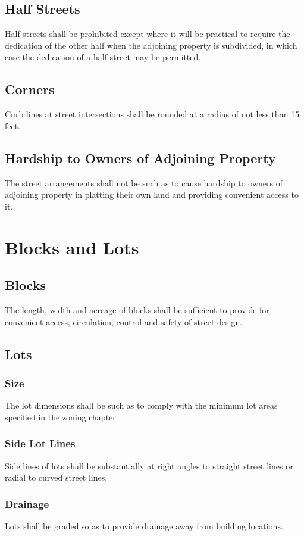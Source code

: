 \subsection{Half Streets}
Half streets shall be prohibited except where it will be practical to require the dedication of the other half when the adjoining property is subdivided, in which case the dedication of a half street may be permitted.
\subsection{Corners}
Curb lines at street intersections shall be rounded at a radius of not less than 15 feet.
\subsection{Hardship to Owners of Adjoining Property}
The street arrangements shall not be such as to cause hardship to owners of adjoining property in platting their own land and providing convenient access to it.

\section{Blocks and Lots}
\subsection{Blocks}
The length, width and acreage of blocks shall be sufficient to provide for convenient access, circulation, control and safety of street design.
\subsection{Lots}
\subsubsection{Size}
The lot dimensions shall be such as to comply with the minimum lot areas specified in the zoning chapter.
\subsubsection{Side Lot Lines}
Side lines of lots shall be substantially at right angles to straight street lines or radial to curved street lines.
\subsubsection{Drainage}
Lots shall be graded so as to provide drainage away from building locations.
